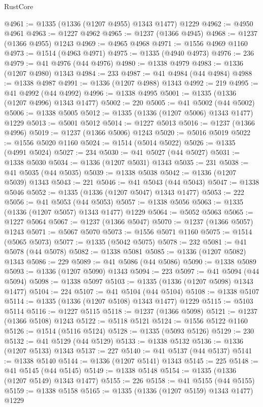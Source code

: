\begin{lexlean}{RustCore}
\begin{coremodule}
@4961 := @1335 (@1336 (@1207 @4955) @1343 @1477) @1229
@4962 := @4950 @4961
@4963 := @1227 @4962
@4965 := @1237 (@1366 @4945)
@4968 := @1237 (@1366 @4955) @1243
@4969 := @4965 @4968
@4971 := @1556 @4969 @1160
@4973 := @1514 (@4963 @4971)
@4975 := @1335 (@4940 @4973)
@4976 := 236
@4979 := @41 @4976 (@44 @4976)
@4980 := @1338 @4979
@4983 := @1336 (@1207 @4980) @1343
@4984 := 233
@4987 := @41 @4984 (@44 @4984)
@4988 := @1338 @4987
@4991 := @1336 (@1207 @4988) @1343
@4992 := 219
@4995 := @41 @4992 (@44 @4992)
@4996 := @1338 @4995
@5001 := @1335 (@1336 (@1207 @4996) @1343 @1477)
@5002 := 220
@5005 := @41 @5002 (@44 @5002)
@5006 := @1338 @5005
@5012 := @1335 (@1336 (@1207 @5006) @1343 @1477) @1229
@5013 := @5001 @5012
@5014 := @1227 @5013
@5016 := @1237 (@1366 @4996)
@5019 := @1237 (@1366 @5006) @1243
@5020 := @5016 @5019
@5022 := @1556 @5020 @1160
@5024 := @1514 (@5014 @5022)
@5026 := @1335 (@4991 @5024)
@5027 := 234
@5030 := @41 @5027 (@44 @5027)
@5031 := @1338 @5030
@5034 := @1336 (@1207 @5031) @1343
@5035 := 231
@5038 := @41 @5035 (@44 @5035)
@5039 := @1338 @5038
@5042 := @1336 (@1207 @5039) @1343
@5043 := 221
@5046 := @41 @5043 (@44 @5043)
@5047 := @1338 @5046
@5052 := @1335 (@1336 (@1207 @5047) @1343 @1477)
@5053 := 222
@5056 := @41 @5053 (@44 @5053)
@5057 := @1338 @5056
@5063 := @1335 (@1336 (@1207 @5057) @1343 @1477) @1229
@5064 := @5052 @5063
@5065 := @1227 @5064
@5067 := @1237 (@1366 @5047)
@5070 := @1237 (@1366 @5057) @1243
@5071 := @5067 @5070
@5073 := @1556 @5071 @1160
@5075 := @1514 (@5065 @5073)
@5077 := @1335 (@5042 @5075)
@5078 := 232
@5081 := @41 @5078 (@44 @5078)
@5082 := @1338 @5081
@5085 := @1336 (@1207 @5082) @1343
@5086 := 229
@5089 := @41 @5086 (@44 @5086)
@5090 := @1338 @5089
@5093 := @1336 (@1207 @5090) @1343
@5094 := 223
@5097 := @41 @5094 (@44 @5094)
@5098 := @1338 @5097
@5103 := @1335 (@1336 (@1207 @5098) @1343 @1477)
@5104 := 224
@5107 := @41 @5104 (@44 @5104)
@5108 := @1338 @5107
@5114 := @1335 (@1336 (@1207 @5108) @1343 @1477) @1229
@5115 := @5103 @5114
@5116 := @1227 @5115
@5118 := @1237 (@1366 @5098)
@5121 := @1237 (@1366 @5108) @1243
@5122 := @5118 @5121
@5124 := @1556 @5122 @1160
@5126 := @1514 (@5116 @5124)
@5128 := @1335 (@5093 @5126)
@5129 := 230
@5132 := @41 @5129 (@44 @5129)
@5133 := @1338 @5132
@5136 := @1336 (@1207 @5133) @1343
@5137 := 227
@5140 := @41 @5137 (@44 @5137)
@5141 := @1338 @5140
@5144 := @1336 (@1207 @5141) @1343
@5145 := 225
@5148 := @41 @5145 (@44 @5145)
@5149 := @1338 @5148
@5154 := @1335 (@1336 (@1207 @5149) @1343 @1477)
@5155 := 226
@5158 := @41 @5155 (@44 @5155)
@5159 := @1338 @5158
@5165 := @1335 (@1336 (@1207 @5159) @1343 @1477) @1229

\end{coremodule}
\end{lexlean}
